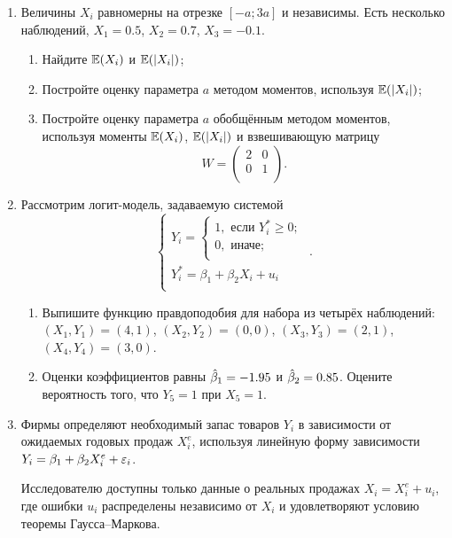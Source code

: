 \documentclass[12pt, a4paper]{article}\usepackage[]{graphicx}\usepackage[]{color}
\begin{document}
\begin{enumerate}

\item Величины $X_i$ равномерны на отрезке $[-a; 3a]$ и независимы. Есть несколько наблюдений, $X_1=0.5$, $X_2=0.7$, $X_3=-0.1$.

\begin{enumerate}
\item Найдите $\mathbb{E}(X_i)$ и $\mathbb{E}(|X_i|)$;
\item Постройте оценку параметра $a$ методом моментов, используя $\mathbb{E}(|X_i|)$;
\item Постройте оценку параметра $a$ обобщённым методом моментов, используя моменты $\mathbb{E}(X_i)$, $\mathbb{E}(|X_i|)$ и взвешивающую матрицу
\[
W=\begin{pmatrix}
2 & 0 \\
0 & 1 \\
\end{pmatrix}.
\]
\end{enumerate}


\item Рассмотрим логит-модель, задаваемую системой
\[
\begin{cases}
Y_i =
\begin{cases}
1, \text{ если } Y_i^* \geq 0; \\
0, \text{ иначе;} \\
\end{cases} \\
Y_i^* = \beta_1 + \beta_2 X_i + u_i \\
\end{cases}.
\]



\begin{enumerate}
\item Выпишите функцию правдоподобия для набора из четырёх наблюдений: $(X_1, Y_1) = (4, 1)$, $(X_2, Y_2) = (0, 0)$,  $(X_3, Y_3) = (2, 1)$,  $(X_4, Y_4) = (3, 0)$.
\item Оценки коэффициентов равны $\hat{\beta}_1 = -1.95$ и $\hat{\beta}_2 = 0.85$. Оцените вероятность того, что $Y_5 = 1$ при $X_5 = 1$.
\end{enumerate}


\item Фирмы определяют необходимый запас товаров $Y_i$ в зависимости от ожидаемых годовых продаж $X^e_i$, используя линейную форму зависимости $Y_i = \beta_1  + \beta_2 X^e_i + \varepsilon_i$.


Исследователю доступны только данные о реальных продажах $X_i = X^e_i + u_i$, где ошибки $u_i$ распределены независимо от $X_i$ и удовлетворяют условию теоремы Гаусса–Маркова.


\end{enumerate}
\end{document}
